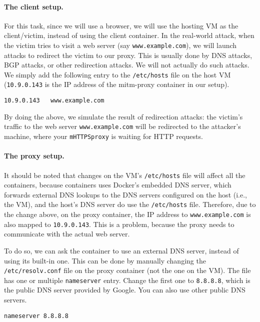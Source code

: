 \paragraph{The client setup.} 
For this task, since we will use a browser, we will 
use the hosting VM as the client/victim, instead of using 
the client container. 
In the real-world attack, when the victim tries to visit
a web server (say \texttt{www.example.com}), we will launch attacks to redirect
the victim to our proxy. This is usually done by DNS attacks, BGP attacks, or other 
redirection attacks. We will not actually do such attacks. We simply 
add the following entry to the \texttt{/etc/hosts} file on the host VM (\texttt{10.9.0.143} 
is the IP address of the mitm-proxy container in our setup). 

\begin{lstlisting}
10.9.0.143   www.example.com
\end{lstlisting}


By doing the above, we simulate the result of redirection attacks:
the victim's traffic to the web server \texttt{www.example.com} 
will be redirected to the attacker's machine, where your \texttt{mHTTPSproxy} 
is waiting for HTTP requests. 

\paragraph{The proxy setup.} 
It should be noted that changes on the VM's \texttt{/etc/hosts} file
will affect all the containers, because containers
uses Docker’s embedded DNS server, which forwards
external DNS lookups to the DNS servers configured on the host (i.e., the VM),
and the host's DNS server do use the \texttt{/etc/hosts} file. Therefore,
due to the change above, on the proxy container, the IP address
to \texttt{www.example.com} is also mapped to \texttt{10.9.0.143}. This is
a problem, because the proxy needs to communicate with the 
actual web server.

To do so, we can ask the container to use an external DNS server, instead of
using its built-in one. This can be done by 
manually changing the \texttt{/etc/resolv.conf} file on the 
proxy container (not the one on the VM). 
The file has one or multiple \texttt{nameserver} entry.
Change the first one to \texttt{8.8.8.8}, which is the public 
DNS server provided by Google. You can also use other 
public DNS servers. 

\begin{lstlisting}
nameserver 8.8.8.8
\end{lstlisting}

